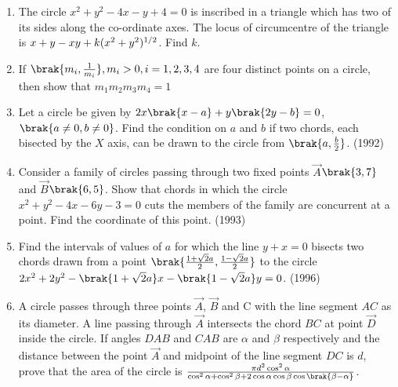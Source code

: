 \begin{enumerate}[label=\thesubsection.\arabic*.,ref=\thesubsection.\theenumi]
%
\hfill {}
\item The circle $x^2+y^2-4x-y+4=0$ is inscribed in a triangle which has two of its sides along the co-ordinate axes. The locus of circumcentre of the triangle is $x+y-xy+k(x^2+y^2)\textsuperscript{1/2}$. Find $k$.
%
\hfill {}
\item If $\brak{ m_i,  \frac{1}{m_i}},  m_i > 0,  i = 1,  2,  3,  4$ are four distinct points on a circle,  then show that $m_1m_2m_3m_4=1$
%
\hfill {}
	\item Let a circle be given by $2x\brak{x-a}+y\brak{2y-b}=0$, $\brak{a\neq0, b\neq0}$. Find the condition on $a$ and $b$ if two chords,  each bisected by the $X$ axis, can be drawn to the circle from $\brak{a, \frac{b}{2}}$.                         
%
\hfill(1992)
%
%
%
%
\item Consider a family of circles passing through two fixed points $\vec{A}$$\brak{3, 7}$ and $\vec{B}$$\brak{6, 5}$. Show that chords in which the circle $x^2+y^2-4x-6y-3=0$ cuts the members of the family are concurrent at a point. Find the coordinate of this point.
%
\hfill(1993)
%
%
%
%
%
%
\item Find the intervals of values of $a$ for which the line $y+x=0$ bisects two chords drawn from a point $\brak {\frac{1+\sqrt{2}a}{2}, \frac{1-\sqrt{2}a}{2}}$ to the circle $2x^2+2y^2-\brak{1+\sqrt{2}a}x-\brak{1-\sqrt{2}a}y=0$.  
%
\hfill(1996)
%
\item A circle passes through three points $\vec{A}$, $\vec{B}$ and C with the line segment $AC$ as its diameter. A line passing through $\vec{A}$ intersects the chord $BC$ at point $\vec{D}$ inside the circle. If angles $DAB$ and $CAB$ are $\alpha$ and $\beta$ respectively and the distance between the point $\vec{A}$ and midpoint of the line segment $DC$ is $d$,  prove that the area of the circle is $\frac{\pi d^2 \cos^2{\alpha} }{\cos^2{\alpha}+\cos^2{\beta}+ 2\cos{\alpha} \cos{\beta} \cos{\brak{\beta-\alpha}}}$.        
%


\end{enumerate}
